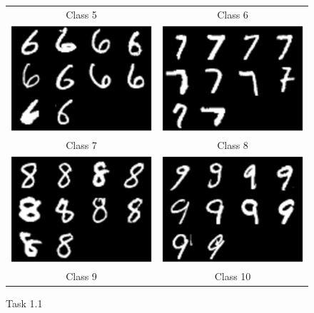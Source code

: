 \documentclass{article}
\begin{document}
\begin{figure}
\begin{tabular}{cc}
     Class 5 & Class 6 \\[6pt]
\includegraphics[width=55mm]{task1_1_imgs_class7.eps} &   \includegraphics[width=55mm]{task1_1_imgs_class8.eps} \\
     Class 7 & Class 8 \\[6pt]
\includegraphics[width=55mm]{task1_1_imgs_class9.eps} &   \includegraphics[width=55mm]{task1_1_imgs_class10.eps} \\
     Class 9 & Class 10 \\[6pt]
     
\end{tabular}
\caption{Task 1.1}
\end{figure}
\end{document}
